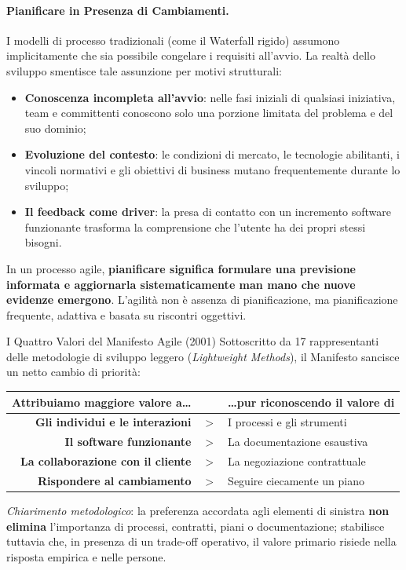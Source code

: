 \documentclass[12pt]{extarticle}
\begin{document}
\paragraph{Pianificare in Presenza di Cambiamenti.}
I modelli di processo tradizionali (come il Waterfall rigido) assumono implicitamente che sia possibile congelare i requisiti all'avvio. La realtà dello sviluppo smentisce tale assunzione per motivi strutturali:
\begin{itemize}
    \item \textbf{Conoscenza incompleta all'avvio}: nelle fasi iniziali di qualsiasi iniziativa, team e committenti conoscono solo una porzione limitata del problema e del suo dominio;
    \item \textbf{Evoluzione del contesto}: le condizioni di mercato, le tecnologie abilitanti, i vincoli normativi e gli obiettivi di business mutano frequentemente durante lo sviluppo;
    \item \textbf{Il feedback come driver}: la presa di contatto con un incremento software funzionante trasforma la comprensione che l'utente ha dei propri stessi bisogni.
\end{itemize}
In un processo agile, \textbf{pianificare significa formulare una previsione informata e aggiornarla sistematicamente man mano che nuove evidenze emergono}. L'agilità non è assenza di pianificazione, ma pianificazione frequente, adattiva e basata su riscontri oggettivi.

\begin{cbox}{I Quattro Valori del Manifesto Agile (2001)}
\noindent Sottoscritto da 17 rappresentanti delle metodologie di sviluppo leggero (\textit{Lightweight Methods}), il Manifesto sancisce un netto cambio di priorità:
\begin{center}
\small
\begin{tabular}{r c l}
    \textbf{Attribuiamo maggiore valore a\dots} & & \textbf{\dots pur riconoscendo il valore di} \\
    \midrule
    \textbf{Gli individui e le interazioni} & $>$ & I processi e gli strumenti \\
    \textbf{Il software funzionante} & $>$ & La documentazione esaustiva \\
    \textbf{La collaborazione con il cliente} & $>$ & La negoziazione contrattuale \\
    \textbf{Rispondere al cambiamento} & $>$ & Seguire ciecamente un piano \\
\end{tabular}
\end{center}
\medskip
\noindent \textit{Chiarimento metodologico}: la preferenza accordata agli elementi di sinistra \textbf{non elimina} l'importanza di processi, contratti, piani o documentazione; stabilisce tuttavia che, in presenza di un trade-off operativo, il valore primario risiede nella risposta empirica e nelle persone.
\end{cbox}
\end{document}
